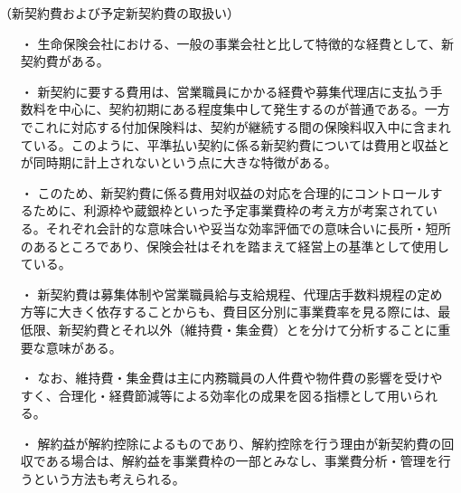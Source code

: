 \documentclass[report,gutter=10mm,fore-edge=10mm,uplatex,dvipdfmx]{jlreq}
\begin{document}
（新契約費および予定新契約費の取扱い）

\begin{itemize}
 \item [・]  生命保険会社における、一般の事業会社と比して特徴的な経費として、新契約費がある。
 \item [・]  新契約に要する費用は、営業職員にかかる経費や募集代理店に支払う手数料を中心に、契約初期にある程度集中して発生するのが普通である。一方でこれに対応する付加保険料は、契約が継続する間の保険料収入中に含まれている。このように、平準払い契約に係る新契約費については費用と収益とが同時期に計上されないという点に大きな特徴がある。
 \item [・]  このため、新契約費に係る費用対収益の対応を合理的にコントロールするために、利源枠や蔵銀枠といった予定事業費枠の考え方が考案されている。それぞれ会計的な意味合いや妥当な効率評価での意味合いに長所・短所のあるところであり、保険会社はそれを踏まえて経営上の基準として使用している。
 \item [・]  新契約費は募集体制や営業職員給与支給規程、代理店手数料規程の定め方等に大きく依存することからも、費目区分別に事業費率を見る際には、最低限、新契約費とそれ以外（維持費・集金費）とを分けて分析することに重要な意味がある。
 \item [・]  なお、維持費・集金費は主に内務職員の人件費や物件費の影響を受けやすく、合理化・経費節減等による効率化の成果を図る指標として用いられる。
 \item [・]  解約益が解約控除によるものであり、解約控除を行う理由が新契約費の回収である場合は、解約益を事業費枠の一部とみなし、事業費分析・管理を行うという方法も考えられる。
\end{itemize}
\end{document}
